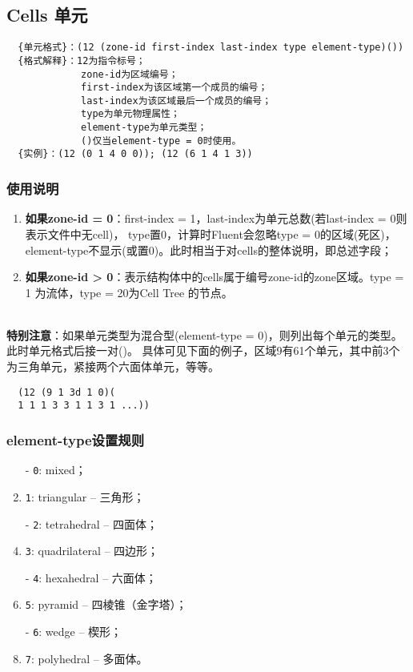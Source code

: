 \documentclass[lang=cn,11pt,a4paper]{elegantpaper} %
\begin{document}
\subsection{Cells 单元}\label{Cells}
\begin{lstlisting}
  {单元格式}：(12 (zone-id first-index last-index type element-type)())
  {格式解释}：12为指令标号；
             zone-id为区域编号；
             first-index为该区域第一个成员的编号；
             last-index为该区域最后一个成员的编号；
             type为单元物理属性；
             element-type为单元类型；
             ()仅当element-type = 0时使用。
  {实例}：(12 (0 1 4 0 0)); (12 (6 1 4 1 3))
\end{lstlisting}

\subsubsection{使用说明}
\begin{enumerate}
  \item \textbf{如果zone-id = 0}：first-index = 1，last-index为单元总数(若last-index = 0则表示文件中无cell)，
                                  type置0，计算时Fluent会忽略type = 0的区域(死区)，element-type不显示(或置0)。此时相当于对cells的整体说明，即总述字段；
  \item \textbf{如果zone-id > 0}：表示结构体中的cells属于编号zone-id的zone区域。type = 1 为流体，type = 20为Cell Tree 的节点。
\end{enumerate}
~\\
\textbf{特别注意}：如果单元类型为混合型(element-type = 0)，则列出每个单元的类型。此时单元格式后接一对()。
具体可见下面的例子，区域9有61个单元，其中前3个为三角单元，紧接两个六面体单元，等等。
\begin{lstlisting}
  (12 (9 1 3d 1 0)(
  1 1 1 3 3 1 1 3 1 ...))
\end{lstlisting}

\subsubsection{element-type设置规则}\label{element-type}
\begin{enumerate}
  \item[-] \lstinline{0}: mixed；
  \item[-] \lstinline{1}: triangular -- 三角形；
  \item[-] \lstinline{2}: tetrahedral -- 四面体；
  \item[-] \lstinline{3}: quadrilateral -- 四边形；
  \item[-] \lstinline{4}: hexahedral -- 六面体；
  \item[-] \lstinline{5}: pyramid -- 四棱锥（金字塔）；
  \item[-] \lstinline{6}: wedge -- 楔形；
  \item[-] \lstinline{7}: polyhedral -- 多面体。
\end{enumerate}
\end{document}
